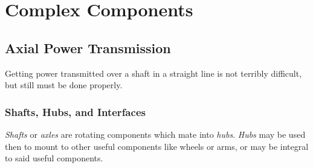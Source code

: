 \chapter{Complex Components}

\section{Axial Power Transmission}

Getting power transmitted over a shaft in a straight line is not terribly difficult, but still must be done properly.

\subsection{Shafts, Hubs, and Interfaces}
	
	\textit{Shafts} or \textit{axles} are rotating components which mate into \textit{hubs}. \textit{Hubs} may be used then to mount to other useful components like wheels or arms, or may be integral to said useful components.

